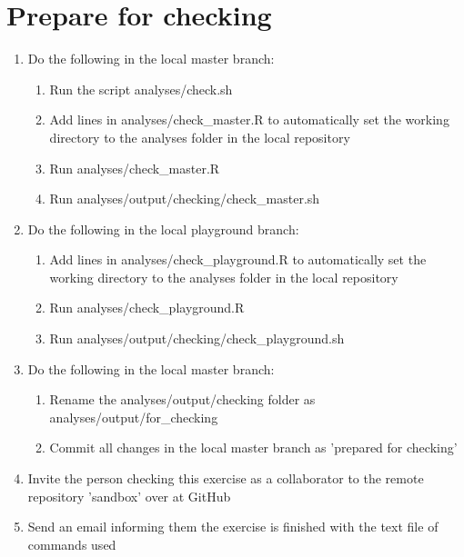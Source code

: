 \documentclass[11pt]{article}
\begin{document}
\section{Prepare for checking}
\begin{enumerate}
  \item Do the following in the local master branch:
  \begin{enumerate}
    \item Run the script analyses/check.sh
    \item Add lines in analyses/check\_master.R to automatically set the working directory to the analyses folder in the local repository
    \item Run analyses/check\_master.R
    \item Run analyses/output/checking/check\_master.sh
  \end{enumerate}
  
  \item Do the following in the local playground branch:
  \begin{enumerate}
    \item Add lines in analyses/check\_playground.R to automatically set the working directory to the analyses folder in the local repository
    \item Run analyses/check\_playground.R
    \item Run analyses/output/checking/check\_playground.sh
  \end{enumerate}
  
  \item Do the following in the local master branch:
  \begin{enumerate}
    \item Rename the analyses/output/checking folder as analyses/output/for\_checking
    \item Commit all changes in the local master branch as 'prepared for checking'
  \end{enumerate}
  
  \item Invite the person checking this exercise as a collaborator to the remote repository 'sandbox' over at GitHub
  \item Send an email informing them the exercise is finished with the text file of commands used
\end{enumerate}
\end{document}
